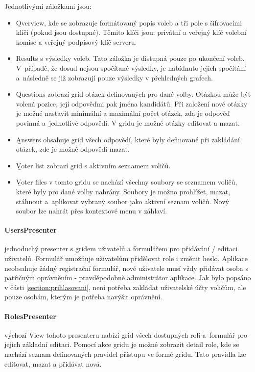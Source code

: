 Jednotlivými záložkami jsou:
\begin{itemize}
	\item \b{Overview}, kde se zobrazuje formátovaný popis voleb a tři pole s šifrovacími klíči (pokud jsou dostupné). Těmito klíči jsou: privátní a veřejný klíč volební komise a veřejný podpisový klíč serveru.
	\item \b{Results} s výsledky voleb. Tato záložka je distupná pouze po ukončení voleb. V~případě, že dosud nejsou spočítané výsledky, je nabídnuto jejich spočítání a~následně se již zobrazují pouze výsledky v přehledných grafech.
	\item \b{Questions} zobrazí grid otázek definovaných pro dané volby. Otázkou může být volená pozice, její odpověďmi pak jména kandidátů. Při založení nové otázky je možné nastavit minimální a maximální počet otázek, zda je odpověď povinná a~jednotlivé odpovědi. V gridu je možné otázky editovat a mazat.
	
	\item \b{Answers} obsahuje grid všech odpovědí, které byly definované při zakládání otázek, zde je možné odpovědi mazat.
	
	\item \b{Voter list} zobrazí grid s aktivním seznamem voličů.
	
	\item \b{Voter files} v tomto gridu se nachází všechny soubory se seznamem voličů, které byly pro dané volby nahrány. Soubory je možno prohlížet, mazat, stáhnout a~aplikovat vybraný soubor jako aktivní seznam voličů. Nový soubor lze nahrát přes kontextové menu v záhlaví.
	
\end{itemize}


\paragraph{UsersPresenter} jednoduchý presenter s gridem uživatelů a formulářem pro přidávání / editaci uživatelů. Formulář umožňuje uživatelům přidělovat role i změnit heslo. Aplikace neobsahuje žádný registrační formulář, nové uživatele musí vždy přidávat osoba s patřičným oprávněním - pravděpodobně administrátor aplikace. Jak bylo popsáno v části \ref{section:prihlasovani}, není potřeba zakládat uživatelské účty voličům, ale pouze osobám, kterým je potřeba navýšit oprávnění.

\paragraph{RolesPresenter} výchozí View tohoto presenteru nabízí grid všech dostupných rolí a~formulář pro jejich základní editaci. Pomocí akce gridu je možné zobrazit detail role, kde se nachází seznam definovaných pravidel přístupu ve formě gridu. Tato pravidla lze editovat, mazat a přidávat nová.

